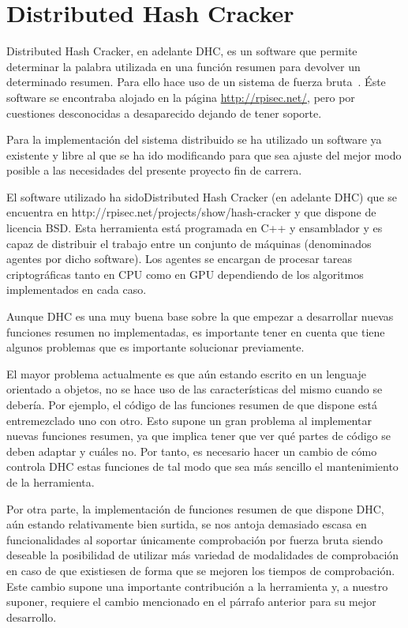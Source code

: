 \chapter{Distributed Hash Cracker}

Distributed Hash Cracker, en adelante DHC, es un software que permite determinar la palabra utilizada en una función resumen para devolver un determinado resumen. Para ello hace uso de un sistema de fuerza bruta~\cite{dhc:paper}. Éste software se encontraba alojado en la página \url{http://rpisec.net/}, pero por cuestiones desconocidas a desaparecido dejando de tener soporte.

Para la implementación del sistema distribuido se ha utilizado un software ya existente y libre al que se ha ido modificando para que sea ajuste del mejor modo posible a las necesidades del presente proyecto fin de carrera.

El software utilizado ha sidoDistributed Hash Cracker (en adelante DHC) que se encuentra en http://rpisec.net/projects/show/hash-cracker y que dispone de licencia BSD. Esta herramienta está programada en C++ y ensamblador y es capaz de distribuir el trabajo entre un conjunto de máquinas (denominados agentes por dicho software). Los agentes se encargan de procesar tareas criptográficas tanto en CPU como en GPU dependiendo de los algoritmos implementados en cada caso.

Aunque DHC es una muy buena base sobre la que empezar a desarrollar nuevas funciones resumen no implementadas, es importante tener en cuenta que tiene algunos problemas que es importante solucionar previamente.

El mayor problema actualmente es que aún estando escrito en un lenguaje orientado a objetos, no se hace uso de las características del mismo cuando se debería. Por ejemplo, el código de las funciones resumen de que dispone está entremezclado uno con otro. Esto supone un gran problema al implementar nuevas funciones resumen, ya que implica tener que ver qué partes de código se deben adaptar y cuáles no. Por tanto, es necesario hacer un cambio de cómo controla DHC estas funciones de tal modo que sea más sencillo el mantenimiento de la herramienta.

Por otra parte, la implementación de funciones resumen de que dispone DHC, aún estando relativamente bien surtida, se nos antoja demasiado escasa en funcionalidades al soportar únicamente comprobación por fuerza bruta siendo deseable la posibilidad de utilizar más variedad de modalidades de comprobación en caso de que existiesen de forma que se mejoren los tiempos de comprobación. Este cambio supone una importante contribución a la herramienta y, a nuestro suponer, requiere el cambio mencionado en el párrafo anterior para su mejor desarrollo.

